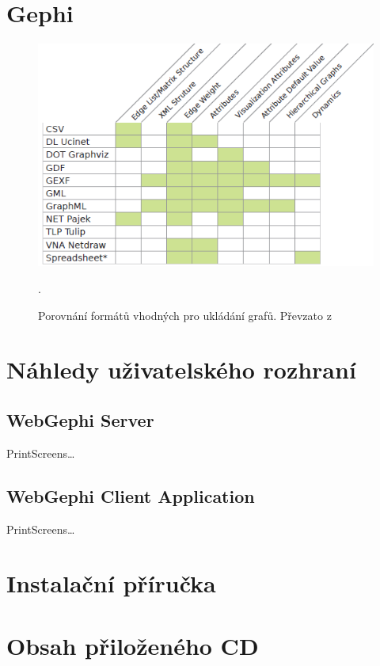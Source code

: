 \documentclass[thesis=M,czech]{FITthesis}[2014/05/6]
\begin{document}
\chapter{Gephi}
\begin{figure}\centering
 	\includegraphics[width=1\textwidth]{images/gephi/graph-format-table-comparison}
 	\caption[Porovnání formátů vhodných pro ukládání grafů]{Porovnání formátů vhodných pro ukládání grafů. Převzato z \cite{gephi}}.\label{fig:gephi-formats-comparation}
\end{figure}

\chapter{Náhledy uživatelského rozhraní}
\section{WebGephi Server}
PrintScreens\ldots
\section{WebGephi Client Application}
PrintScreens\ldots

\chapter{Instalační příručka}

\chapter{Obsah přiloženého CD}


\begin{figure}
\end{figure}
\end{document}

